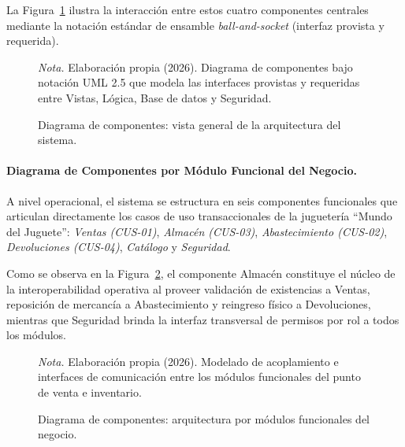 \documentclass[12pt,a4paper]{article}
\begin{document}
La Figura~\ref{fig:componentes_sistema} ilustra la interacción entre estos cuatro componentes centrales mediante la notación estándar de ensamble \emph{ball-and-socket} (interfaz provista y requerida).

\begin{figure}[H]
  \centering
  \caption{Diagrama de componentes: vista general de la arquitectura del sistema.}
  \label{fig:componentes_sistema}
  \resizebox{0.95\linewidth}{!}{}
  \par\vspace{0.2cm}
  {\raggedright \small \emph{Nota.} Elaboración propia (2026). Diagrama de componentes bajo notación UML 2.5 que modela las interfaces provistas y requeridas entre Vistas, Lógica, Base de datos y Seguridad.\par}
\end{figure}

\paragraph{Diagrama de Componentes por Módulo Funcional del Negocio.}
A nivel operacional, el sistema se estructura en seis componentes funcionales que articulan directamente los casos de uso transaccionales de la juguetería ``Mundo del Juguete'': \emph{Ventas (CUS-01)}, \emph{Almacén (CUS-03)}, \emph{Abastecimiento (CUS-02)}, \emph{Devoluciones (CUS-04)}, \emph{Catálogo} y \emph{Seguridad}. 

Como se observa en la Figura~\ref{fig:componentes_modulos}, el componente Almacén constituye el núcleo de la interoperabilidad operativa al proveer validación de existencias a Ventas, reposición de mercancía a Abastecimiento y reingreso físico a Devoluciones, mientras que Seguridad brinda la interfaz transversal de permisos por rol a todos los módulos.

\begin{figure}[H]
  \centering
  \caption{Diagrama de componentes: arquitectura por módulos funcionales del negocio.}
  \label{fig:componentes_modulos}
  \resizebox{0.90\linewidth}{!}{}
  \par\vspace{0.2cm}
  {\raggedright \small \emph{Nota.} Elaboración propia (2026). Modelado de acoplamiento e interfaces de comunicación entre los módulos funcionales del punto de venta e inventario.\par}
\end{figure}
\end{document}
